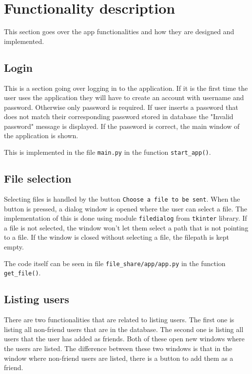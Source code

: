\section{Functionality description}
This section goes over the app functionalities and how they are designed and implemented.

\subsection{Login}
This is a section going over logging in to the application. If it is the first time the user uses the application they will have to create an account with username
and password. Otherwise only password is required. If user inserts a password that does not match their corresponding password stored in database the 
"Invalid password" message is displayed. If the password is correct, the main window of the application is shown.

This is implemented in the file \texttt{main.py} in the function \texttt{start\_app()}.

\subsection{File selection}
Selecting files is handled by the button \texttt{Choose a file to be sent}. When the button is pressed, a dialog window is opened where the user can select
a file. The implementation of this is done using module \texttt{filedialog} from \texttt{tkinter} library. If a file is not selected, the window won't let them
select a path that is not pointing to a file. If the window is closed without selecting a file, the filepath is kept empty.

The code itself can be seen in file \texttt{file\_share/app/app.py} in the function \texttt{get\_file()}.

\subsection{Listing users}
There are two functionalities that are related to listing users. The first one is listing all non-friend users that are in the database. The second one 
is listing all users that the user has added as friends. Both of these open new windows where the users are listed. The difference between these two windows
is that in the window where non-friend users are listed, there is a button to add them as a friend.

